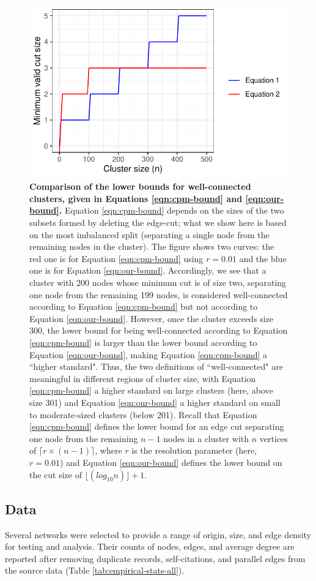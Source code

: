 \documentclass[11pt]{article}   	%
\begin{document}
\begin{figure}[H]
\centering
\includegraphics[width=0.7\linewidth]{figs/well_connected_definition.pdf}
\caption{\textbf{Comparison of  the  lower bounds for well-connected clusters,  given in Equations \ref{eqn:cpm-bound} and \ref{eqn:our-bound}.}
Equation \ref{eqn:cpm-bound} depends on the sizes of the two subsets formed by deleting the edge-cut; what we show here is based on the most imbalanced split (separating a single node from the remaining nodes in the cluster).
The figure shows two curves: the red one is for Equation \ref{eqn:cpm-bound} using $r=0.01$ and the blue one is for Equation \ref{eqn:our-bound}.
Accordingly, we see that a cluster with 200 nodes whose minimum cut is of size two, separating one node from the remaining 199 nodes, is considered well-connected
according to Equation \ref{eqn:cpm-bound}  but not according to Equation \ref{eqn:our-bound}.  However, once the cluster exceeds size 300, the lower bound for being well-connected according to
Equation \ref{eqn:cpm-bound}   is larger than the lower bound according to Equation \ref{eqn:our-bound}, making
Equation \ref{eqn:cpm-bound} a ``higher standard".
Thus, the two definitions of ``well-connected"  are meaningful in different
regions of cluster size, with Equation \ref{eqn:cpm-bound}  a higher standard on large clusters (here, above size 301) and Equation \ref{eqn:our-bound}   a higher standard on small to moderate-sized clusters (below 201).
Recall that Equation \ref{eqn:cpm-bound}  defines the lower bound for an edge cut separating one node from the remaining $n-1$ nodes
  in a cluster with $n$ vertices of $\lceil r \times (n-1) \rceil$, where $r$ is the resolution parameter (here, $r=0.01$)
and Equation \ref{eqn:our-bound} defines the lower bound on the cut size of $\lfloor(log_{10}n)\rfloor +1$.}
\end{figure}

 \subsection{Data} Several networks were selected to provide a range of origin, size, and edge density for testing and analysis. Their counts of nodes, edges, and average degree are reported after removing duplicate records,
self-citations, and parallel edges from the source data (Table \ref{tab:empirical-stats-all}).
\end{document}
